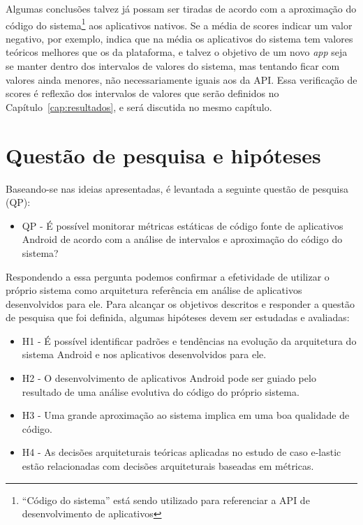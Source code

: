 Algumas conclusões talvez já possam ser tiradas de acordo com a aproximação do código do sistema\footnote{``Código do sistema'' está sendo utilizado para referenciar a API de desenvolvimento de aplicativos} aos aplicativos nativos. Se a média de scores indicar um valor negativo, por exemplo, indica que na média os aplicativos do sistema tem valores teóricos melhores que os da plataforma, e talvez o objetivo de um novo \textit{app} seja se manter dentro dos intervalos de valores do sistema, mas tentando ficar com valores ainda menores, não necessariamente iguais aos da API. Essa verificação de scores é reflexão dos intervalos de valores que serão definidos no Capítulo~\ref{cap:resultados}, e será discutida no mesmo capítulo.

\section{Questão de pesquisa e hipóteses}

Baseando-se nas ideias apresentadas, é levantada a seguinte questão de pesquisa (QP):

\begin{itemize}
\item QP - É possível monitorar métricas estáticas de código fonte de aplicativos Android de acordo com a análise de intervalos e aproximação do código do sistema?
\end{itemize}

Respondendo a essa pergunta podemos confirmar a efetividade de utilizar o próprio sistema como arquitetura referência em análise de aplicativos desenvolvidos para ele. Para alcançar os objetivos descritos e responder a questão de pesquisa que foi definida, algumas hipóteses devem ser estudadas e avaliadas:

\begin{itemize}
\item H1 - É possível identificar padrões e tendências na evolução da arquitetura do sistema Android e nos aplicativos desenvolvidos para ele.
\item H2 - O desenvolvimento de aplicativos Android pode ser guiado pelo resultado de uma análise evolutiva do código do próprio sistema.
\item H3 - Uma grande aproximação ao sistema implica em uma boa qualidade de código.
\item H4 - As decisões arquiteturais teóricas aplicadas no estudo de caso e-lastic estão relacionadas com decisões arquiteturais baseadas em métricas.
\end{itemize}

